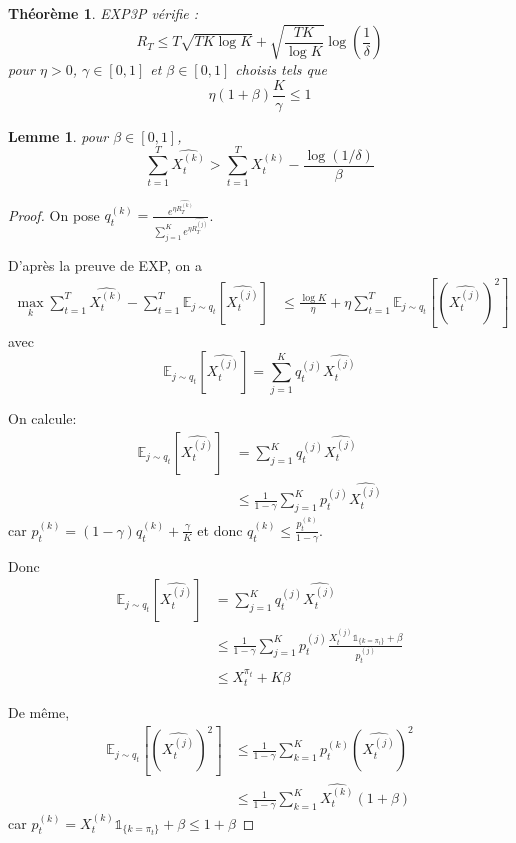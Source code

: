\documentclass{article}
\newtheorem{theorem}{Théorème}[section]
\newtheorem{lemma}{Lemme}[section]
\theoremstyle{remark}
\theoremstyle{remark}
\begin{document}
\begin{theorem}
   EXP3P vérifie :
   $$
   R_T \leq T \sqrt{T K \log K} + \sqrt{\frac{T K}{\log K}} \log\left(\frac{1}{\delta}\right)
   $$
   pour $\eta > 0$, $\gamma \in [0,1]$ et $\beta \in [0,1]$ choisis tels que
   $$
   \eta (1+\beta) \frac{K}{\gamma} \leq 1
   $$
\end{theorem}

\begin{lemma}
   pour $\beta \in [0,1]$,
   $$
   \sum_{t=1}^T \widehat{X_t^{(k)}} > \sum_{t=1}^T X_t^{(k)} - \frac{\log(1/\delta)}{\beta}
   $$
\end{lemma}

\begin{proof}
   On pose $q_t^{(k)} = \frac{e^{\eta \widehat{R_T^{(k)}}}}{\sum\limits_{j=1}^Ke^{\eta \widehat{R_T^{(j)}}}}$.

   D'après la preuve de EXP, on a
   \begin{align}
      \max_k \sum_{t=1}^T \widehat{X_t^{(k)}} - \sum_{t=1}^T \mathbb{E}_{j \sim q_t}\left[\widehat{X_t^{(j)}}\right]
      &\leq \frac{\log K}{\eta} + \eta \sum_{t=1}^T \mathbb{E}_{j \sim q_t}\left[\left(\widehat{X_t^{(j)}}\right)^2\right]
      \label{eq:EXP}
   \end{align}
   avec
   $$
   \mathbb{E}_{j \sim q_t}\left[\widehat{X_t^{(j)}}\right] = \sum_{j=1}^K q_t^{(j)} \widehat{X_t^{(j)}}
   $$

   On calcule:
   \begin{align*}
      \mathbb{E}_{j \sim q_t}\left[\widehat{X_t^{(j)}}\right] &= \sum_{j=1}^K q_t^{(j)} \widehat{X_t^{(j)}} \\
      &\leq \frac{1}{1-\gamma} \sum_{j=1}^K p_t^{(j)} \widehat{X_t^{(j)}}
   \end{align*}
   car $p_t^{(k)} = (1-\gamma) q_t^{(k)} + \frac{\gamma}{K}$ et donc $q_t^{(k)} \leq \frac{p_t^{(k)}}{1-\gamma}$.

   Donc
   \begin{align*}
      \mathbb{E}_{j \sim q_t}\left[\widehat{X_t^{(j)}}\right] &= \sum_{j=1}^K q_t^{(j)} \widehat{X_t^{(j)}} \\
      &\leq \frac{1}{1-\gamma} \sum_{j=1}^K p_t^{(j)} \frac{X_t^{(j)} \mathbb{1}_{\{k=\pi_t\}} + \beta}{p_t^{(j)}} \\
      &\leq X_t^{\pi_t} + K \beta
   \end{align*}

   De même,
   \begin{align*}
      \mathbb{E}_{j \sim q_t}\left[\left(\widehat{X_t^{(j)}}\right)^2\right] &\leq \frac{1}{1 - \gamma} \sum_{k=1}^K p_t^{(k)} \left(\widehat{X_t^{(j)}}\right)^2 \\
      &\leq \frac{1}{1-\gamma} \sum_{k=1}^K \widehat{X_t^{(k)}} (1+\beta)
   \end{align*}
   car $p_t^{(k)} = X_t^{(k)} \mathbb{1}_{\{k = \pi_t\}} + \beta \leq 1 + \beta$


\end{proof}
\end{document}
